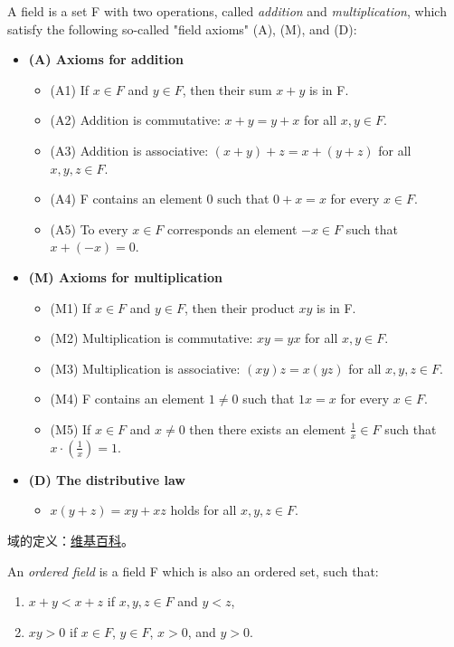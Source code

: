 \documentclass[../poma-note.tex]{subfiles}
\begin{document}
\begin{definition}
	A field is a set F with two operations, called \textit{addition} and \textit{multiplication},
	which satisfy the following so-called "field axioms" (A), (M), and (D):

	\begin{itemize}
		\item[] \textbf{(A) Axioms for addition}
			\begin{itemize}
				\item[] (A1) If $x \in F$ and $y \in F$, then their sum $x + y$ is in F.
				\item[] (A2) Addition is commutative: $x + y = y + x$ for all $x,y \in F$.
				\item[] (A3) Addition is associative: $(x+y)+z=x+(y+z)$ for all $x,y,z \in F$.
				\item[] (A4) F contains an element 0 such that $0+x=x$ for every $x \in F$.
				\item[] (A5) To every $x \in F$ corresponds an element $-x \in F$ such that $x+(-x)=0$.
			\end{itemize}
		\item[] \textbf{(M) Axioms for multiplication}
			\begin{itemize}
				\item[] (M1) If $x \in F$ and $y \in F$, then their product $xy$ is in F.
				\item[] (M2) Multiplication is commutative: $xy = yx$ for all $x,y \in F$.
				\item[] (M3) Multiplication is associative: $(xy)z = x(yz)$ for all $x,y,z \in F$.
				\item[] (M4) F contains an element $1 \ne 0$ such that $1x = x$ for every $x \in F$.
				\item[] (M5) If $x \in F$ and $x \ne 0$ then there exists an element $\frac{1}{x} \in F$
					such that $x \cdot (\frac{1}{x}) = 1$.
			\end{itemize}
		\item[] \textbf{(D) The distributive law}
			\begin{itemize}
				\item[] $x(y+z) = xy+xz$ holds for all $x,y,z \in F$.
			\end{itemize}
	\end{itemize}
\end{definition}

\anote
域的定义：\href{https://en.wikipedia.org/wiki/Field_(mathematics)}{维基百科}。

\setcounter{poma}{16}
\begin{definition}
	An \textit{ordered field} is a field F which is also an ordered set, such that:

	\begin{enumerate}
		\item $x+y<x+z$ if $x,y,z \in F$ and $y<z$,
		\item $xy>0$ if $x \in F$, $y \in F$, $x>0$, and $y>0$.
	\end{enumerate}
\end{definition}
\end{document}
